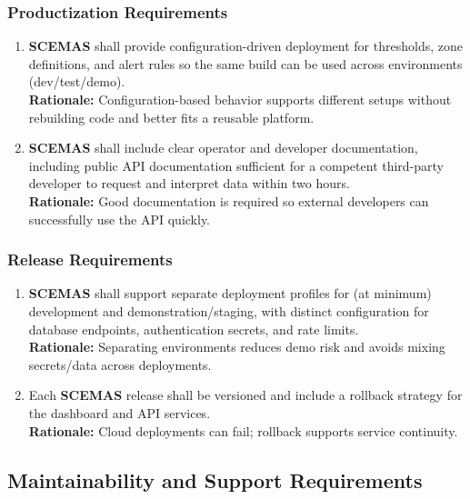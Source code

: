 \documentclass[]{article}
\begin{document}
\subsubsection{Productization Requirements}
\label{ssub:productization_requirements}
\begin{enumerate}[{OE-P}1. ]
	\item \textbf{SCEMAS} shall provide configuration-driven deployment for thresholds, zone definitions, and alert rules so the same build can be used across environments (dev/test/demo).\\
    \textbf{Rationale:} Configuration-based behavior supports different setups without rebuilding code and better fits a reusable platform.
    
	\item \textbf{SCEMAS} shall include clear operator and developer documentation, including public API documentation sufficient for a competent third-party developer to request and interpret data within two hours.\\
    \textbf{Rationale:} Good documentation is required so external developers can successfully use the API quickly.
\end{enumerate}

\subsubsection{Release Requirements}
\label{ssub:release_requirements}
\begin{enumerate}[{OE-R}1. ]
	\item \textbf{SCEMAS} shall support separate deployment profiles for (at minimum) development and demonstration/staging, with distinct configuration for database endpoints, authentication secrets, and rate limits.\\
    \textbf{Rationale:} Separating environments reduces demo risk and avoids mixing secrets/data across deployments.
    
	\item Each \textbf{SCEMAS} release shall be versioned and include a rollback strategy for the dashboard and API services.\\
    \textbf{Rationale:} Cloud deployments can fail; rollback supports service continuity.
\end{enumerate}



\subsection{Maintainability and Support Requirements}
\label{sub:maintainability_and_support_requirements}
\end{document}
